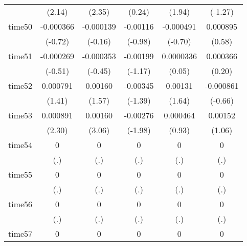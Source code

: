 \begin{table}[htbp]
\begin{tabular}{l*{5}{c}}
            &      (2.14)         &      (2.35)         &      (0.24)         &      (1.94)         &     (-1.27)         \\
time50      &   -0.000366         &   -0.000139         &    -0.00116         &   -0.000491         &    0.000895         \\
            &     (-0.72)         &     (-0.16)         &     (-0.98)         &     (-0.70)         &      (0.58)         \\
time51      &   -0.000269         &   -0.000353         &    -0.00199         &   0.0000336         &    0.000366         \\
            &     (-0.51)         &     (-0.45)         &     (-1.17)         &      (0.05)         &      (0.20)         \\
time52      &    0.000791         &     0.00160         &    -0.00345         &     0.00131         &   -0.000861         \\
            &      (1.41)         &      (1.57)         &     (-1.39)         &      (1.64)         &     (-0.66)         \\
time53      &    0.000891\sym{*}  &     0.00160\sym{**} &    -0.00276\sym{*}  &    0.000464         &     0.00152         \\
            &      (2.30)         &      (3.06)         &     (-1.98)         &      (0.93)         &      (1.06)         \\
time54      &           0         &           0         &           0         &           0         &           0         \\
            &         (.)         &         (.)         &         (.)         &         (.)         &         (.)         \\
time55      &           0         &           0         &           0         &           0         &           0         \\
            &         (.)         &         (.)         &         (.)         &         (.)         &         (.)         \\
time56      &           0         &           0         &           0         &           0         &           0         \\
            &         (.)         &         (.)         &         (.)         &         (.)         &         (.)         \\
time57      &           0         &           0         &           0         &           0         &           0         \\

\end{tabular}
\end{table}
